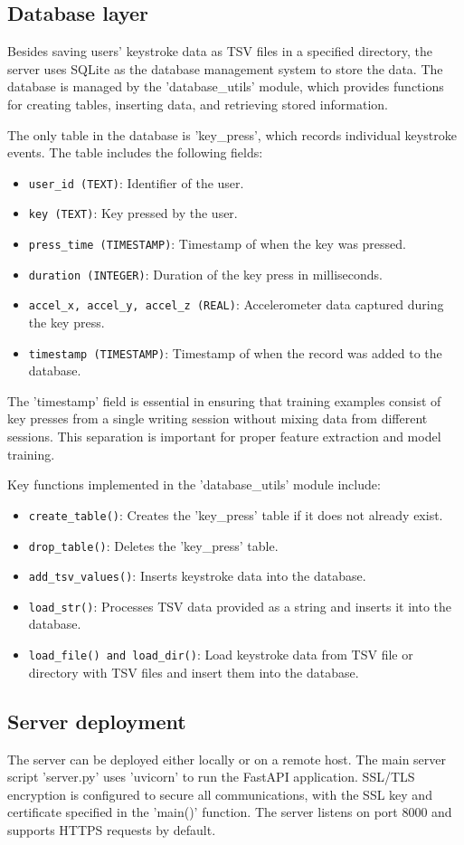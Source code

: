 \subsection{Database layer}
Besides saving users' keystroke data as TSV files in a specified directory, the server uses SQLite as the database management system to store the data. The database is managed by the 'database\_utils' module, which provides functions for creating tables, inserting data, and retrieving stored information.

The only table in the database is 'key\_press', which records individual keystroke events. The table includes the following fields:
\begin{itemize}
    \item \texttt{user\_id (TEXT)}: Identifier of the user.
    \item \texttt{key (TEXT)}: Key pressed by the user.
    \item \texttt{press\_time (TIMESTAMP)}: Timestamp of when the key was pressed.
    \item \texttt{duration (INTEGER)}: Duration of the key press in milliseconds.
    \item \texttt{accel\_x, accel\_y, accel\_z (REAL)}: Accelerometer data captured during the key press.
    \item \texttt{timestamp (TIMESTAMP)}: Timestamp of when the record was added to the database.
\end{itemize}
The 'timestamp' field is essential in ensuring that training examples consist of key presses from a single writing session without mixing data from different sessions. This separation is important for proper feature extraction and model training.

Key functions implemented in the 'database\_utils' module include:
\begin{itemize}
    \item \texttt{create\_table()}: Creates the 'key\_press' table if it does not already exist.
    \item \texttt{drop\_table()}: Deletes the 'key\_press' table.
    \item \texttt{add\_tsv\_values()}: Inserts keystroke data into the database.
    \item \texttt{load\_str()}: Processes TSV data provided as a string and inserts it into the database.
    \item \texttt{load\_file() and load\_dir()}: Load keystroke data from TSV file or directory with TSV files and insert them into the database.
\end{itemize}

\subsection{Server deployment}
The server can be deployed either locally or on a remote host. The main server script 'server.py' uses 'uvicorn' to run the FastAPI application. SSL/TLS encryption is configured to secure all communications, with the SSL key and certificate specified in the 'main()' function. The server listens on port 8000 and supports HTTPS requests by default.